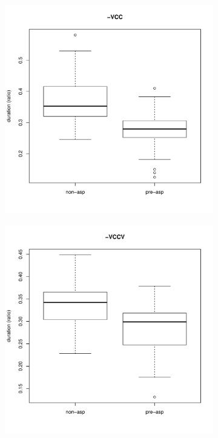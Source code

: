 \documentclass[11pt,a4paper,openany]{memoir}\usepackage[]{graphicx}\usepackage[]{color}
\newenvironment{knitrout}{}{} %
\begin{document}
\begin{figure}
\begin{subfigure}{.5\textwidth}
\centering
\begin{knitrout}
\color{fgcolor}
\includegraphics[width=\textwidth]{img/mono-stop-box-1} 

\end{knitrout}
\label{f:monostop}
\end{subfigure}
\begin{subfigure}{.5\textwidth}
\centering
\begin{knitrout}
\color{fgcolor}
\includegraphics[width=\textwidth]{img/di-stop-box-1} 


\end{knitrout}
\end{subfigure}
\end{figure}
\end{document}
